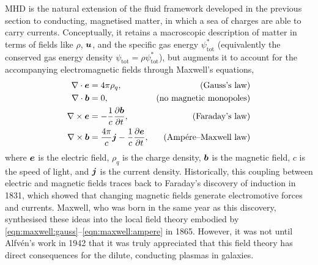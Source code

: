MHD is the natural extension of the fluid framework developed in the previous section to conducting, magnetised matter, in which a sea of charges are able to carry currents. Conceptually, it retains a macroscopic description of matter in terms of fields like $\rho$, $\bm{u}$, and the specific gas energy $\psi^{*}_\mathrm{tot}$ (equivalently the conserved gas energy density $\psi_\mathrm{tot} = \rho \psi^{*}_\mathrm{tot}$), but augments it to account for the accompanying electromagnetic fields through Maxwell's equations,
\begin{align}
    \nabla \cdot \bm{e}
        &= 4\pi \rho_q
        , & \mbox{(Gauss's law)} \label{eqn:maxwell:gauss} \\
    \nabla \cdot \bm{b}
        &= 0
        , & \mbox{(no magnetic monopoles)} \label{eqn:mhd:monopoles} \\
    \nabla \times \bm{e}
        &= -\frac{1}{c} \frac{\partial \bm{b}}{\partial t}
        , & \mbox{(Faraday's law)} \label{eqn:maxwell:faraday} \\
    \nabla \times \bm{b}
        &= \frac{4\pi}{c} \bm{j} - \frac{1}{c} \frac{\partial \bm{e}}{\partial t}
        , & \mbox{(Amp\'ere--Maxwell law)} \label{eqn:maxwell:ampere}
\end{align}
where $\bm{e}$ is the electric field, $\rho_q$ is the charge density, $\bm{b}$ is the magnetic field, $c$ is the speed of light, and $\bm{j}$ is the current density. Historically, this coupling between electric and magnetic fields traces back to Faraday's discovery of induction in 1831, which showed that changing magnetic fields generate electromotive forces and currents. Maxwell, who was born in the same year as this discovery, synthesised these ideas into the local field theory embodied by \autoref{eqn:maxwell:gauss}--\ref{eqn:maxwell:ampere} in 1865. However, it was not until Alfv\'en's work in 1942 that it was truly appreciated that this field theory has direct consequences for the dilute, conducting plasmas in galaxies.

